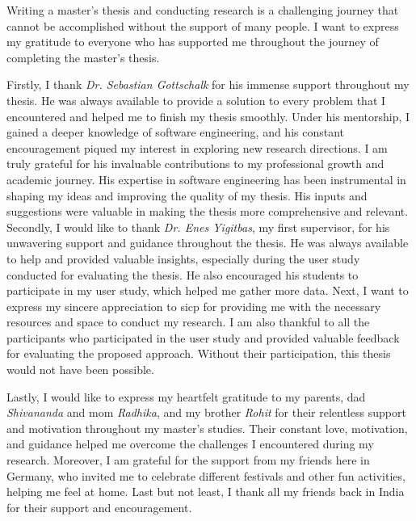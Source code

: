
\begin{acknowledgements}      


Writing a master's thesis and conducting research is a challenging journey that cannot be accomplished without the support of many people. 
I want to express my gratitude to everyone who has supported me throughout the journey of completing the master's thesis.

Firstly, I thank \textit{Dr. Sebastian Gottschalk} for his immense support throughout my thesis. 
He was always available to provide a solution to every problem that I encountered and helped me to finish my thesis smoothly.
Under his mentorship, I gained a deeper knowledge of software engineering, and his constant encouragement piqued my interest in exploring new research directions. 
I am truly grateful for his invaluable contributions to my professional growth and academic journey.
His expertise in software engineering has been instrumental in shaping my ideas and improving the quality of my thesis. 
His inputs and suggestions were valuable in making the thesis more comprehensive and relevant.
Secondly, I would like to thank \textit{Dr. Enes Yigitbas}, my first supervisor, for his unwavering support and guidance throughout the thesis. 
He was always available to help and provided valuable insights, especially during the user study conducted for evaluating the thesis. 
He also encouraged his students to participate in my user study, which helped me gather more data.
Next, I want to express my sincere appreciation to \ac{sicp} for providing me with the necessary resources and space to conduct my research.
I am also thankful to all the participants who participated in the user study and provided valuable feedback for evaluating the proposed approach. Without their participation, this thesis would not have been possible.

Lastly, I would like to express my heartfelt gratitude to my parents, dad \textit{Shivananda} and mom \textit{Radhika}, and my brother \textit{Rohit} for their relentless support and motivation throughout my master's studies. 
Their constant love, motivation, and guidance helped me overcome the challenges I encountered during my research. 
Moreover, I am grateful for the support from my friends here in Germany, who invited me to celebrate different festivals and other fun activities, helping me feel at home.
Last but not least, I thank all my friends back in India for their support and encouragement.
\end{acknowledgements}